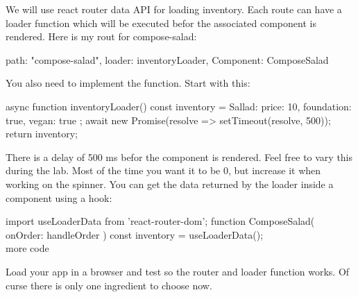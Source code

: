 \documentclass[fleqn, article, a4paper]{memoir}
\begin{document}
\begin{Assignments}
\item We will use react router data API for loading inventory. Each route can have a loader function which will be executed befor the associated component is rendered. Here is my rout for compose-salad:
\begin{Code}
{
  path: "compose-salad",
  loader: inventoryLoader,
  Component: ComposeSalad
}
\end{Code}
You also need to implement the  function. Start with this:
\begin{Code}
async function inventoryLoader() {
  const inventory = { Sallad: { price: 10, foundation: true, vegan: true } };
  await new Promise(resolve => setTimeout(resolve, 500));
  return inventory;
}
\end{Code}
There is a delay of 500 ms befor the component is rendered. Feel free to vary this during the lab. Most of the time you want it to be 0, but increase it when working on the spinner. You can get the data returned by the loader inside a component using a hook:
\begin{Code}
import { useLoaderData } from 'react-router-dom';
function ComposeSalad({ onOrder: handleOrder }) {
  const inventory = useLoaderData();
  \\ more code
}
\end{Code}
Load your app in a browser and test so the router and loader function works. Of curse there is only one ingredient to choose now.


\end{Assignments}
\end{document}
